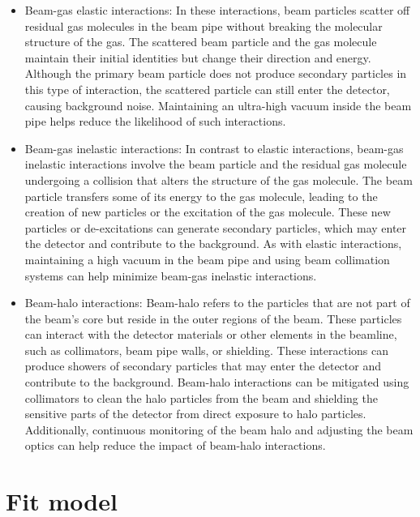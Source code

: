 \begin{itemize}

\item Beam-gas elastic interactions: In these interactions, beam particles scatter off residual gas molecules in the beam pipe without breaking the molecular structure of the gas. The scattered beam particle and the gas molecule maintain their initial identities but change their direction and energy. Although the primary beam particle does not produce secondary particles in this type of interaction, the scattered particle can still enter the detector, causing background noise. Maintaining an ultra-high vacuum inside the beam pipe helps reduce the likelihood of such interactions.

\item Beam-gas inelastic interactions: In contrast to elastic interactions, beam-gas inelastic interactions involve the beam particle and the residual gas molecule undergoing a collision that alters the structure of the gas molecule. The beam particle transfers some of its energy to the gas molecule, leading to the creation of new particles or the excitation of the gas molecule. These new particles or de-excitations can generate secondary particles, which may enter the detector and contribute to the background. As with elastic interactions, maintaining a high vacuum in the beam pipe and using beam collimation systems can help minimize beam-gas inelastic interactions.

\item Beam-halo interactions: Beam-halo refers to the particles that are not part of the beam's core but reside in the outer regions of the beam. These particles can interact with the detector materials or other elements in the beamline, such as collimators, beam pipe walls, or shielding. These interactions can produce showers of secondary particles that may enter the detector and contribute to the background. Beam-halo interactions can be mitigated using collimators to clean the halo particles from the beam and shielding the sensitive parts of the detector from direct exposure to halo particles. Additionally, continuous monitoring of the beam halo and adjusting the beam optics can help reduce the impact of beam-halo interactions.

\end{itemize}


\section{Fit model}

